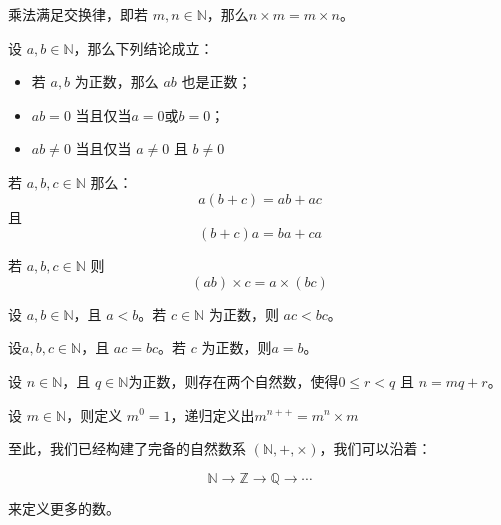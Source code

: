 \begin{theorem}[交换律]
	乘法满足交换律，即若 $m,n\in \mathbb N$，那么$n\times m = m\times n$。
\end{theorem}


\begin{theorem}[乘法的其他性质]
	设 $a,b\in \mathbb N$，那么下列结论成立：
	\begin{itemize}
		\item 若 $a,b$ 为正数，那么 $ab$ 也是正数；
		\item $ab=0$ 当且仅当$a=0$或$b=0$；
		\item $ab\ne 0$ 当且仅当 $a\ne 0$ 且 $b\ne 0$
	\end{itemize}
\end{theorem}

\begin{theorem}[分配律]
	若 $a,b,c\in \mathbb N$ 那么：
	$$
	a(b+c) = ab+ac
	$$
	\noindent 且
	$$
	(b+c)a = ba+ca
	$$
\end{theorem}

\begin{theorem}[结合律]
	若 $a,b,c\in\mathbb N$ 则
	$$
	(ab)\times c = a\times (bc)
	$$
\end{theorem}


\begin{theorem}[保序性]
	设 $a,b\in \mathbb N$，且 $a<b$。若 $c\in \mathbb N$ 为正数，则 $ac<bc$。
\end{theorem}

\begin{theorem}[消去律]
	设$a,b,c\in \mathbb N$，且 $ac=bc$。若 $c$ 为正数，则$a=b$。
\end{theorem}

\begin{theorem}[欧几里得算法]
	设 $n\in \mathbb N$，且 $q\in \mathbb N$为正数，则存在两个自然数，使得$0\le r < q$ 且 $n=mq+r$。
\end{theorem}


\begin{definition}[幂]
	设 $m\in \mathbb N$，则定义 $m^0=1$，递归定义出$m^{n++}=m^n\times m$
\end{definition}


至此，我们已经构建了完备的自然数系 $(\mathbb N, +, \times)$，我们可以沿着：

$$
\mathbb N\rightarrow \mathbb Z\rightarrow \mathbb Q\rightarrow \cdots
$$

\noindent 来定义更多的数。


